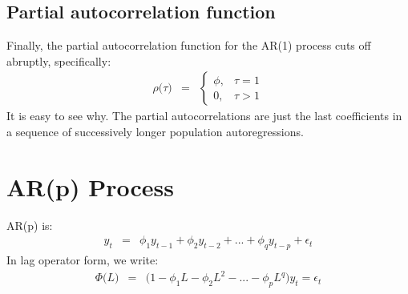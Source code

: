 \subsection{Partial autocorrelation function}

Finally, the partial autocorrelation function for the AR(1) process cuts off abruptly, specifically:
\begin{eqnarray}
\rho\big(\tau\big) &=& \begin{cases}
	\phi, & \tau = 1\\
	0, & \tau > 1
\end{cases}
\end{eqnarray}
It is easy to see why. The partial autocorrelations are just the last coefficients in a sequence of successively longer population autoregressions.

\section{AR(p) Process}
AR(p) is:
\begin{eqnarray}
	y_{t} &=& \phi_{1}y_{t - 1} + \phi_{2}y_{t - 2} + ... + \phi_{q}y_{t - p} + \epsilon_{t}
\end{eqnarray}
In lag operator form, we write:
\begin{eqnarray}
	\Phi\big(L\big) &=& \Big(1 - \phi_{1}L - \phi_{2}L^{2} - ... - \phi_{p}L^{q}\Big) y_{t} = \epsilon_{t}
\end{eqnarray}

